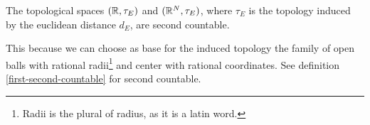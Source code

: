 \begin{prop}\label{RR-second-countable}
	The topological spaces $(\mathbb R, \tau_E)$ and $(\mathbb R^N, \tau_E)$, where $\tau_E$ is the topology induced by the euclidean distance $d_E$, are second countable.
\end{prop}
This because we can choose as base for the induced topology the family of open balls with rational radii\footnote{Radii is the plural of radius, as it is a latin word.} and center with rational coordinates. See definition \vref{first-second-countable} for second countable.



